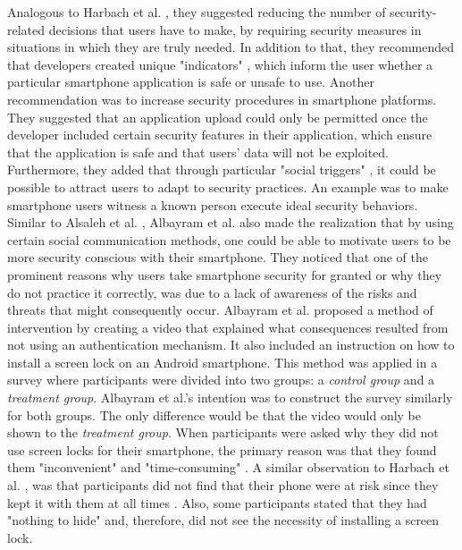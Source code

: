 Analogous to Harbach et al. \cite{harbach}, they suggested reducing the number of security-related decisions that users have to make, by requiring security measures in situations in which they are truly needed. In addition to that, they recommended that developers created unique "indicators" \cite{Alsaleh}, which inform the user whether a particular smartphone application is safe or unsafe to use. Another recommendation was to increase security procedures in smartphone platforms. They suggested that an application upload could only be permitted once the developer included certain security features in their application, which ensure that the application is safe and that users' data will not be exploited. Furthermore, they added that through particular "social triggers" \cite{Alsaleh}, it could be possible to attract users to adapt to security practices. An example was to make smartphone users witness a known person execute ideal security behaviors. \\

Similar to Alsaleh et al. \cite{Alsaleh}, Albayram et al. \cite{Albayram:2017:BUL:3235924.3235929} also made the realization that by using certain social communication methods, one could be able to motivate users to be more security conscious with their smartphone. They noticed that one of the prominent reasons why users take smartphone security for granted or why they do not practice it correctly, was due to a lack of awareness of the risks and threats that might consequently occur. Albayram et al. \cite{Albayram:2017:BUL:3235924.3235929} proposed a method of intervention by creating a video that explained what consequences resulted from not using an authentication mechanism. It also included an instruction on how to install a screen lock on an Android smartphone. This method was applied in a survey where participants were divided into two groups: a \textit{control group} and a \textit{treatment group}. Albayram et al.'s \cite{Albayram:2017:BUL:3235924.3235929} intention was to construct the survey similarly for both groups. The only difference would be that the video would only be shown to the \textit{treatment group}. When participants were asked why they did not use screen locks for their smartphone, the primary reason was that they found them "inconvenient" and "time-consuming" \cite{Albayram:2017:BUL:3235924.3235929}. A similar observation to Harbach et al. \cite{harbach}, was that participants did not find that their phone were at risk since they kept it with them at all times \cite{Albayram:2017:BUL:3235924.3235929}. Also, some participants stated that they had "nothing to hide" and, therefore, did not see the necessity of installing a screen lock.\\

